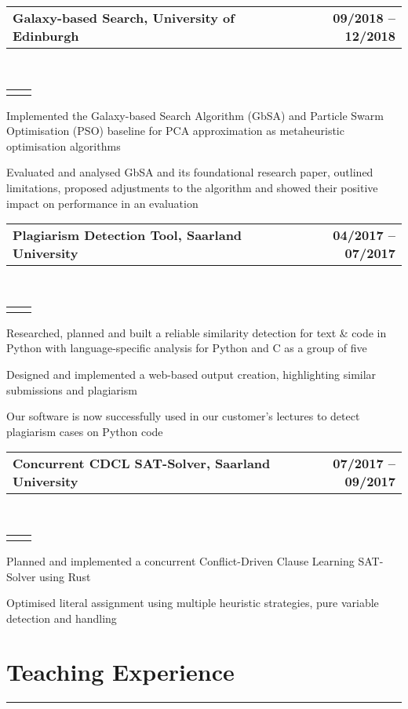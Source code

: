 \documentclass[]{deedy-resume}
\makeatletter
\newcommand{\headerrow}[2]
{\begin{tabular*}{\linewidth}{l@{\extracolsep{\fill}}r}
	\fontspec{Helvetica}\fontsize{12pt}{12pt}\selectfont\bfseries{\color{subheadings}#1} &
	\fontspec{Helvetica}\fontsize{12pt}{12pt}\selectfont\bfseries{\color{subheadings}#2} \\
\end{tabular*}}
\newcommand{\locationrow}[2]
{\begin{tabular*}{\linewidth}{l@{\extracolsep{\fill}}r}
        \color{headings}\scshape\fontspec{Heiti TC Medium}\fontsize{10pt}{12pt}\selectfont{#1}  &
        \color{headings}\scshape\fontspec{Heiti TC Medium}\fontsize{10pt}{12pt}\selectfont{#2}  \\
\end{tabular*}}
\makeatother
\begin{document}
\noindent
\headerrow{Galaxy-based Search, University of Edinburgh}{09/2018 -- 12/2018}
\\
\locationrow{Group Project for Natural Computing Lecture}{}
\begin{tightitemize}{1.7em}
    \item Implemented the Galaxy-based Search Algorithm (GbSA) and Particle Swarm Optimisation (PSO) baseline 
    for PCA approximation as metaheuristic optimisation algorithms
    \item Evaluated and analysed GbSA and its foundational research paper, outlined limitations, proposed adjustments to 
    the algorithm and showed their positive impact on performance in an evaluation
\end{tightitemize}
\largesectionsep

\newpage
\noindent
\headerrow{Plagiarism Detection Tool, Saarland University}{04/2017 -- 07/2017}
\\
\locationrow{Group Project for Software Engineering Lecture}{}
\begin{tightitemize}{1.7em}
    \item Researched, planned and built a reliable similarity detection for text \& code in Python with language-specific analysis for Python and C as a group of five
    \item Designed and implemented a web-based output creation, highlighting similar submissions and plagiarism
    \item Our software is now successfully used in our customer's lectures to detect plagiarism cases on Python code
\end{tightitemize}
\largesectionsep

\noindent
\headerrow{Concurrent CDCL SAT-Solver, Saarland University}{07/2017 -- 09/2017}
\\
\locationrow{Group Project for Modern Imperative Programming Languages Seminar}{}
\begin{tightitemize}{1.7em}
    \item Planned and implemented a concurrent Conflict-Driven Clause Learning SAT-Solver using Rust
    \item Optimised literal assignment using multiple heuristic strategies, pure variable detection and handling
\end{tightitemize}
\largesectionsep


\section*{Teaching Experience}
\hrule
\vspace{0.4em}
\end{document}
